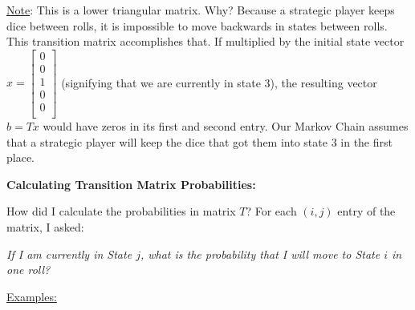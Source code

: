 \documentclass[12pt,a4paper]{article}
\begin{document}
\vspace{5mm}

\begin{flushleft}
\underline{Note}: This is a lower triangular matrix. Why? Because a strategic player keeps dice between rolls, it is impossible to move backwards in states between rolls. This transition matrix accomplishes that. If multiplied by the initial state vector $x = \begin{bmatrix}
0 \\[2pt]
0 \\[2pt]
1 \\[2pt]
0 \\[2pt]
0 \\[2pt]
\end{bmatrix}$ (signifying that we are currently in state 3), the resulting vector $b = Tx$ would have zeros in its first and second entry. Our Markov Chain assumes that a strategic player will keep the dice that got them into state 3 in the first place.
\end{flushleft}

\vspace{5mm}

\textbf{Calculating Transition Matrix Probabilities:}

\begin{flushleft}
How did I calculate the probabilities in matrix $T$? For each $(i, j)$ entry of the matrix, I asked:
\end{flushleft}
\begin{center}
\textit{If I am currently in State $j$, what is the probability that I will move to State $i$ in one roll?}
\end{center}

\begin{flushleft}
\underline{Examples:}
\end{flushleft}
\end{document}
